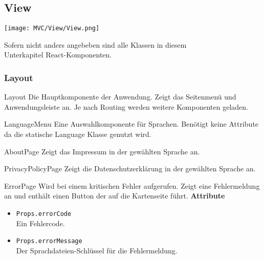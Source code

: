 \subsection{View}

\texttt{[image: MVC/View/View.png]}
\newpage

Sofern nicht anders angebeben sind alle Klassen in diesem 
\\Unterkapitel React-Komponenten.

\subsubsection{Layout}
\begin{Class}{Layout}
    Die Hauptkomponente der Anwendung. Zeigt das Seitenmenü und Anwendungsleiste an.
    Je nach Routing werden weitere Komponenten geladen.
\end{Class}

\begin{Class}{LanguageMenu}
    Eine Auswahlkomponente für Sprachen.
    Benötigt keine Attribute da die statische Language Klasse genutzt wird.
\end{Class}

\begin{Class}{AboutPage}
    Zeigt das Impressum in der gewählten Sprache an.
\end{Class}

\begin{Class}{PrivacyPolicyPage}
    Zeigt die Datenschutzerklärung in der gewählten Sprache an.
\end{Class}

\begin{Class}{ErrorPage}
    Wird bei einem kritischen Fehler aufgerufen.
    Zeigt eine Fehlermeldung an und enthält einen Button der auf die Kartenseite führt.
    \textbf{Attribute}
    \begin{itemize}
        \item \texttt{Props.errorCode}
        \\ Ein Fehlercode.
        \item \texttt{Props.errorMessage}
        \\ Der Sprachdateien-Schlüssel für die Fehlermeldung.
    \end{itemize}
\end{Class}

